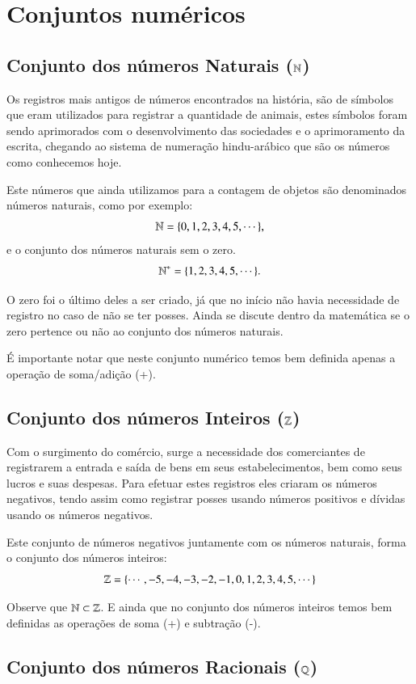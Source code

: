 \chapter{Conjuntos numéricos}

 \section{Conjunto dos números Naturais (\texorpdfstring{$\mathbb{N}$}{N})}

Os registros mais antigos de números encontrados na história, são de símbolos que eram utilizados para registrar a quantidade de animais, estes símbolos foram sendo aprimorados com o desenvolvimento das sociedades e o aprimoramento da escrita, chegando ao sistema de numeração hindu-arábico que são os números como conhecemos hoje.

Este números que ainda utilizamos para a contagem de objetos são denominados números naturais, como por exemplo:
\[\mathbb{N}= \{0, 1, 2, 3, 4, 5, \cdots \},\]
e o conjunto dos números naturais sem o zero.
\[\mathbb{N}^{*}= \{1, 2, 3, 4, 5, \cdots \}.\]

O zero foi o último deles a ser criado, já que no início não havia necessidade de registro no caso de não se ter posses.
Ainda se discute dentro da matemática se o zero pertence ou não ao conjunto dos números naturais.

É importante notar que neste conjunto numérico temos bem definida apenas a operação de soma/adição (+).

\section{Conjunto dos números Inteiros (\texorpdfstring{$\mathbb{Z}$}{Z})}

Com o surgimento do comércio, surge a necessidade dos comerciantes de registrarem a entrada e saída de bens em seus estabelecimentos, bem como seus lucros e suas despesas. Para efetuar estes registros eles criaram os números negativos, tendo assim como registrar posses usando números positivos e dívidas usando os números negativos.

Este conjunto de números negativos juntamente com os números naturais, forma o conjunto dos números inteiros:
\[\mathbb{Z}= \{ \cdots, -5, -4, -3, -2, -1, 0, 1, 2, 3, 4, 5, \cdots \}\]

Observe que $\mathbb{N} \subset \mathbb{Z}$. E ainda que no conjunto dos números inteiros temos bem definidas as operações de soma (+) e subtração (-).

\section{Conjunto dos números Racionais (\texorpdfstring{$\mathbb{Q}$}{Q})}

